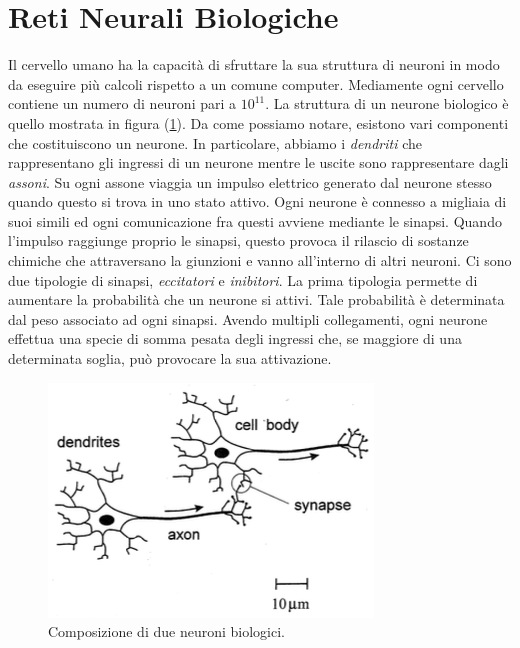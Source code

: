 \section{Reti Neurali Biologiche}
Il cervello umano ha la capacità di sfruttare la sua struttura di neuroni in 
modo da eseguire più calcoli rispetto a un comune computer. Mediamente 
ogni cervello contiene un numero di neuroni pari a $10^{11}$. La struttura di un 
neurone biologico è quello mostrata in figura (\ref{biological neuron}). Da come possiamo notare, 
esistono vari componenti che costituiscono un neurone. In particolare, 
abbiamo i \emph{dendriti} che rappresentano gli ingressi di un neurone mentre le 
uscite sono rappresentare dagli \emph{assoni}. Su ogni assone viaggia un impulso 
elettrico generato dal neurone stesso quando questo si trova in uno stato attivo. 
Ogni neurone è connesso a migliaia di suoi simili ed ogni comunicazione 
fra questi avviene mediante le sinapsi. Quando l'impulso raggiunge proprio 
le sinapsi, questo provoca il rilascio di sostanze chimiche che attraversano 
la giunzioni e vanno all'interno di altri neuroni. Ci sono due tipologie di 
sinapsi, \emph{eccitatori} e \emph{inibitori}. La prima tipologia permette di aumentare 
la probabilità che un neurone si attivi. Tale probabilità è determinata dal 
peso associato ad ogni sinapsi. Avendo multipli collegamenti, ogni neurone 
effettua una specie di somma pesata degli ingressi che, se maggiore di una 
determinata soglia, può provocare la sua attivazione. 
\begin{figure}
    \centering
    \includegraphics[width = 0.6 \linewidth]{images/biological neuron.png}
    \centering
    \caption{Composizione di due neuroni biologici.}
    \label{biological neuron}
\end{figure}

